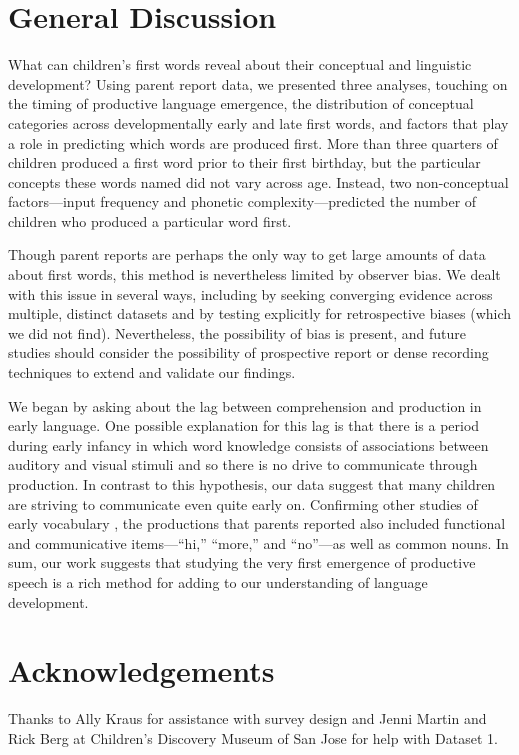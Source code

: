 \documentclass[10pt,letterpaper]{article}
\begin{document}
\section{General Discussion}

What can children's first words reveal about their conceptual and linguistic development? Using parent report data, we presented three analyses, touching on the timing of productive language emergence, the distribution of conceptual categories across developmentally early and late first words, and factors that play a role in predicting which words are produced first. More than three quarters of children produced a first word prior to their first birthday, but the particular concepts these words named did not vary across age. Instead, two non-conceptual factors---input frequency and phonetic complexity---predicted the number of children who produced a particular word first.

Though parent reports are perhaps the only way to get large amounts of data about first words, this method is nevertheless limited by observer bias. We dealt with this issue in several ways, including by seeking converging evidence across multiple, distinct datasets and by testing explicitly for retrospective biases (which we did not find). Nevertheless, the possibility of bias is present, and future studies should consider the possibility of prospective report or dense recording techniques to extend and validate our findings. 

We began by asking about the lag between comprehension and production in early language. One possible explanation for this lag is that there is a period during early infancy in which word knowledge consists of associations between auditory and visual stimuli and so there is no drive to communicate through production. In contrast to this hypothesis, our data suggest that many children are striving to communicate even quite early on. Confirming other studies of early vocabulary \cite{tardif2007}, the productions that parents reported also included functional and communicative items---``hi,'' ``more,'' and ``no''---as well as common nouns. In sum, our work suggests that studying the very first emergence of productive speech is a rich method for adding to our understanding of language development.

\section{Acknowledgements}

Thanks to Ally Kraus for assistance with survey design and Jenni Martin and Rick Berg at Children's Discovery Museum of San Jose for help with Dataset 1.



\setlength{\bibleftmargin}{.125in}
\setlength{\bibindent}{-\bibleftmargin}


\end{document}

